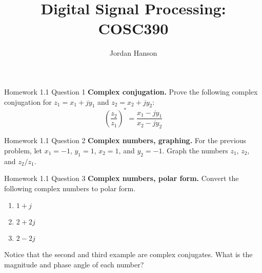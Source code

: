 \documentclass{beamer}
\title{Digital Signal Processing: COSC390}
\author{Jordan Hanson}
\institute{Whittier College Department of Physics and Astronomy}
\begin{document}
\maketitle

\begin{frame}{Homework 1.1 Question 1}
\textbf{Complex conjugation.}  Prove the following complex conjugation for $z_1 = x_1 + j y_1$ and $z_2 = x_2 + j y_2$:
\begin{equation}
\left(\frac{z_2}{z_1}\right)^* = \frac{x_1 - j y_1}{x_2 - j y_2}
\end{equation}
\end{frame}

\begin{frame}{Homework 1.1 Question 2}
\textbf{Complex numbers, graphing.}  For the previous problem, let $x_1 = -1$, $y_1 = 1$, $x_2 = 1$, and $y_2 = -1$.  Graph the numbers $z_1$, $z_2$, and $z_2/z_1$.
\end{frame}

\begin{frame}{Homework 1.1 Question 3}
\textbf{Complex numbers, polar form.} Convert the following complex numbers to polar form.
\begin{enumerate}
\item $ 1+j$
\item $2 + 2j$
\item $2 - 2j$
\end{enumerate}
Notice that the second and third example are complex conjugates.  What is the magnitude and phase angle of each number?
\end{frame}
\end{document}
